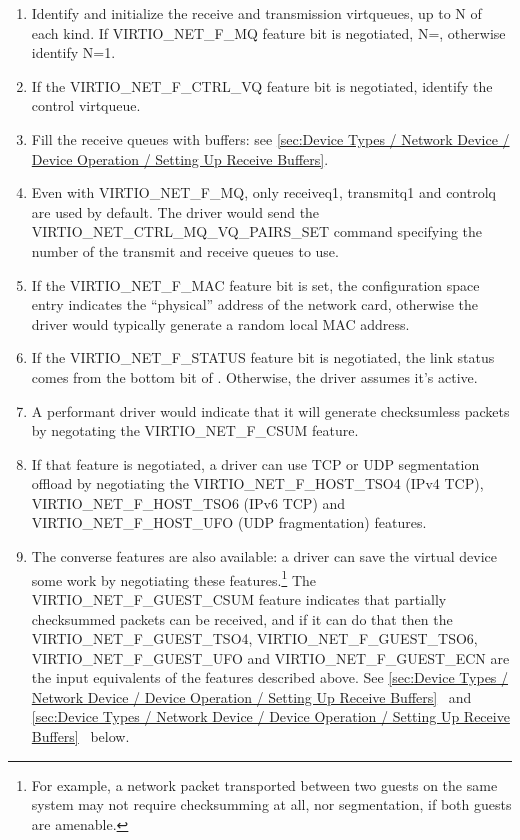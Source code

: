 \begin{enumerate}
\item Identify and initialize the receive and
  transmission virtqueues, up to N of each kind. If
  VIRTIO_NET_F_MQ feature bit is negotiated,
  N=, otherwise identify N=1.

\item If the VIRTIO_NET_F_CTRL_VQ feature bit is negotiated,
  identify the control virtqueue.

\item Fill the receive queues with buffers: see \ref{sec:Device Types / Network Device / Device Operation / Setting Up Receive Buffers}.

\item Even with VIRTIO_NET_F_MQ, only receiveq1, transmitq1 and
  controlq are used by default.  The driver would send the
  VIRTIO_NET_CTRL_MQ_VQ_PAIRS_SET command specifying the
  number of the transmit and receive queues to use.

\item If the VIRTIO_NET_F_MAC feature bit is set, the configuration
  space  entry indicates the ``physical'' address of the
  network card, otherwise the driver would typically generate a random
  local MAC address.

\item If the VIRTIO_NET_F_STATUS feature bit is negotiated, the link
  status comes from the bottom bit of .
  Otherwise, the driver assumes it's active.

\item A performant driver would indicate that it will generate checksumless
  packets by negotating the VIRTIO_NET_F_CSUM feature.

\item If that feature is negotiated, a driver can use TCP or UDP
  segmentation offload by negotiating the VIRTIO_NET_F_HOST_TSO4 (IPv4
  TCP), VIRTIO_NET_F_HOST_TSO6 (IPv6 TCP) and VIRTIO_NET_F_HOST_UFO
  (UDP fragmentation) features.

\item The converse features are also available: a driver can save
  the virtual device some work by negotiating these features.\footnote{For example, a network packet transported between two guests on
the same system may not require checksumming at all, nor segmentation,
if both guests are amenable.
}
   The VIRTIO_NET_F_GUEST_CSUM feature indicates that partially
  checksummed packets can be received, and if it can do that then
  the VIRTIO_NET_F_GUEST_TSO4, VIRTIO_NET_F_GUEST_TSO6,
  VIRTIO_NET_F_GUEST_UFO and VIRTIO_NET_F_GUEST_ECN are the input
  equivalents of the features described above.
  See \ref{sec:Device Types / Network Device / Device Operation / Setting Up Receive Buffers}~ and \ref{sec:Device Types / Network Device / Device Operation / Setting Up Receive Buffers}~ below.
\end{enumerate}

